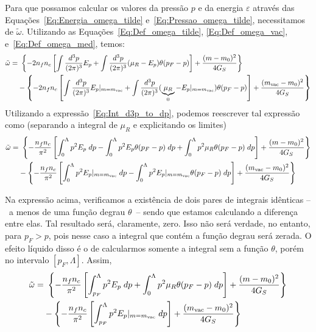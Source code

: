 \begin{fullwidth}

Para que possamos calcular os valores da pressão $p$ e da energia $\varepsilon$ através das Equações~\eqref{Eq:Energia_omega_tilde} e~\eqref{Eq:Pressao_omega_tilde}, necessitamos de $\tilde{\omega}$. Utilizando as Equações~\eqref{Eq:Def_omega_tilde}, \eqref{Eq:Def_omega_vac}, e~\eqref{Eq:Def_omega_med}, temos:
\begin{equation}
\begin{split}
\tilde{\omega} =&~ \left\{-2 n_f n_c \left[\int\frac{d^3p}{(2\pi)^3} E_p + \int\frac{d^3p}{(2\pi)^3}(\mu_R - E_p)\theta(p_F - p)\right] + \frac{(m-m_0)^2}{4G_S}\right\} \\
&-\left\{-2 n_f n_c \left[\int\frac{d^3p}{(2\pi)^3}E_p|_{m=m_{\rm{vac}}} + \int\frac{d^3p}{(2\pi)^3}(\underbrace{\mu_R}_{0} - E_p|_{m = m_{\rm{vac}}}) \theta(p_F - p)\right] + \frac{(m_{\rm{vac}} - m_0)^2}{4G_S}\right\}
\end{split}
\end{equation}
%
Utilizando a expressão~\eqref{Eq:Int_d3p_to_dp}, podemos reescrever tal expressão como (separando a integral de $\mu_R$ e explicitando os limites)
\begin{equation}
\begin{split}
\tilde{\omega} =&~ \left\{- \frac{n_f n_c}{\pi^2} \left[\int_0^\Lambda p^2E_p \; dp - \int_0^\Lambda p^2 E_p \theta(p_F - p)\;dp + \int_0^\Lambda p^2 \mu_R \theta(p_F - p)\;dp \right] + \frac{(m-m_0)^2}{4G_S}\right\} \\
&-\left\{- \frac{n_f n_c}{\pi^2} \left[\int_0^\Lambda p^2 E_p|_{m=m_{\rm{vac}}} \; dp - \int_0^\Lambda p^2 E_p|_{m = m_{\rm{vac}}} \theta(p_F - p) \; dp\right] + \frac{(m_{\rm{vac}} - m_0)^2}{4G_S}\right\}
\end{split}
\end{equation}

Na expressão acima, verificamos a existência de dois pares de integrais idênticas --~a menos de uma função degrau $\theta$~-- sendo que estamos calculando a diferença entre elas. Tal resultado será, claramente, zero. Isso não será verdade, no entanto, para $p_F > p$, pois nesse caso a integral que contém a função degrau será zerada. O efeito líquido disso é o de calcularmos somente a integral sem a função $\theta$, porém no intervalo $[p_F, \Lambda]$. Assim,
\begin{equation}
\begin{split}
\tilde{\omega} =&~ \left\{- \frac{n_f n_c}{\pi^2} \left[\int_{p_F}^\Lambda p^2E_p \; dp + \int_0^\Lambda p^2 \mu_R \theta(p_F - p)\;dp \right] + \frac{(m-m_0)^2}{4G_S}\right\} \\
&-\left\{- \frac{n_f n_c}{\pi^2} \left[\int_{p_F}^\Lambda p^2 E_p|_{m=m_{\rm{vac}}} \; dp \right] + \frac{(m_{\rm{vac}} - m_0)^2}{4G_S}\right\}
\end{split}
\end{equation}
\end{fullwidth}
